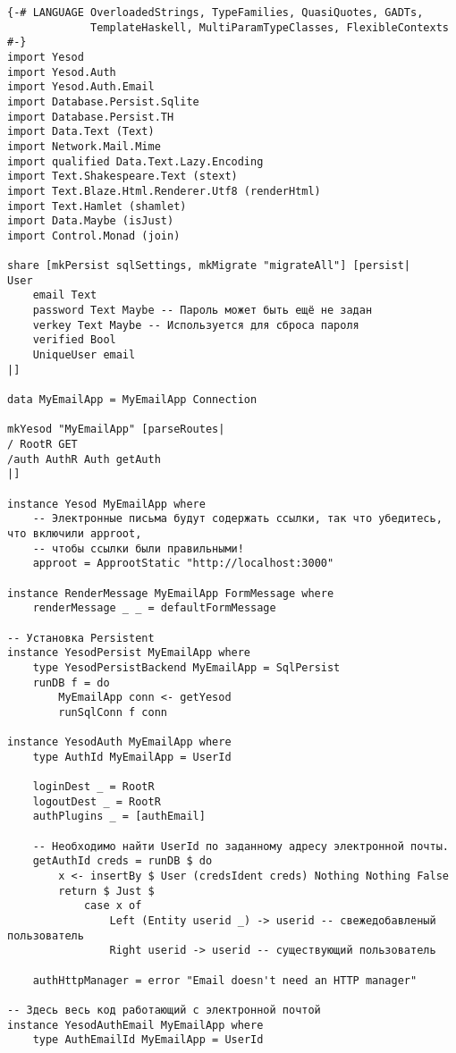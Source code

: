 \begin{lstlisting}
{-# LANGUAGE OverloadedStrings, TypeFamilies, QuasiQuotes, GADTs,
             TemplateHaskell, MultiParamTypeClasses, FlexibleContexts #-}
import Yesod
import Yesod.Auth
import Yesod.Auth.Email
import Database.Persist.Sqlite
import Database.Persist.TH
import Data.Text (Text)
import Network.Mail.Mime
import qualified Data.Text.Lazy.Encoding
import Text.Shakespeare.Text (stext)
import Text.Blaze.Html.Renderer.Utf8 (renderHtml)
import Text.Hamlet (shamlet)
import Data.Maybe (isJust)
import Control.Monad (join)

share [mkPersist sqlSettings, mkMigrate "migrateAll"] [persist|
User
    email Text
    password Text Maybe -- Пароль может быть ещё не задан
    verkey Text Maybe -- Используется для сброса пароля
    verified Bool
    UniqueUser email
|]

data MyEmailApp = MyEmailApp Connection

mkYesod "MyEmailApp" [parseRoutes|
/ RootR GET
/auth AuthR Auth getAuth
|]

instance Yesod MyEmailApp where
    -- Электронные письма будут содержать ссылки, так что убедитесь, что включили approot, 
    -- чтобы ссылки были правильными!
    approot = ApprootStatic "http://localhost:3000"

instance RenderMessage MyEmailApp FormMessage where
    renderMessage _ _ = defaultFormMessage

-- Установка Persistent
instance YesodPersist MyEmailApp where
    type YesodPersistBackend MyEmailApp = SqlPersist
    runDB f = do
        MyEmailApp conn <- getYesod
        runSqlConn f conn

instance YesodAuth MyEmailApp where
    type AuthId MyEmailApp = UserId

    loginDest _ = RootR
    logoutDest _ = RootR
    authPlugins _ = [authEmail]

    -- Необходимо найти UserId по заданному адресу электронной почты.
    getAuthId creds = runDB $ do
        x <- insertBy $ User (credsIdent creds) Nothing Nothing False
        return $ Just $
            case x of
                Left (Entity userid _) -> userid -- свежедобавленый пользователь
                Right userid -> userid -- существующий пользователь

    authHttpManager = error "Email doesn't need an HTTP manager"

-- Здесь весь код работающий с электронной почтой
instance YesodAuthEmail MyEmailApp where
    type AuthEmailId MyEmailApp = UserId


\end{lstlisting}
